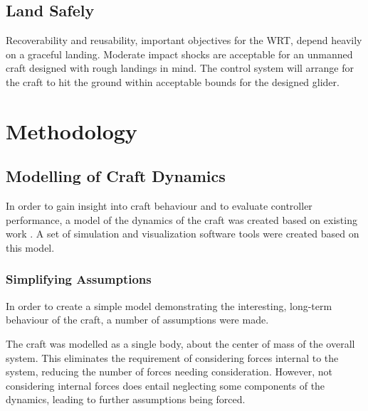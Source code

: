 \documentclass{sydeStyle}
\begin{document}
\section{Land Safely}

Recoverability and reusability, important objectives for the WRT, depend heavily
on a graceful landing. Moderate impact shocks are acceptable for an unmanned
craft designed with rough landings in mind. The control system will arrange for
the craft to hit the ground within acceptable bounds for the designed glider.

\chapter{Methodology}

\section{Modelling of Craft Dynamics}
\label{sec:modelling}

In order to gain insight into craft behaviour and to evaluate controller
performance, a model of the dynamics of the craft was created based on existing
work \cite{Rogallo1960}\cite{Layton1963}\cite{spottiswoode}. A set of simulation
and visualization software tools were created based on this model.

\subsection{Simplifying Assumptions}

In order to create a simple model demonstrating the interesting, long-term
behaviour of the craft, a number of assumptions were made.

The craft was modelled as a single body, about the center of mass of the overall
system. This eliminates the requirement of considering forces internal to the
system, reducing the number of forces needing consideration. However, not
considering internal forces does entail neglecting some components of the
dynamics, leading to further assumptions being forced.
\end{document}
